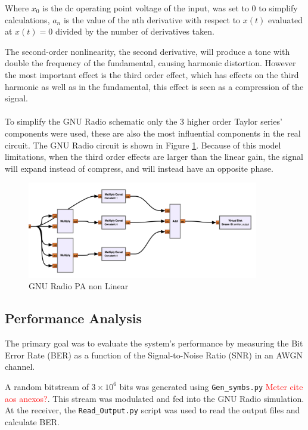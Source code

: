 Where \(x_0\) is the dc operating point voltage of the input, was set to 0 to simplify calculations, \(a_n\) is the value of the nth derivative with respect to \(x(t)\) evaluated at \(x(t) = 0\) divided by the number of derivatives taken.

The second-order nonlinearity, the second derivative, will produce a tone with double the frequency of the fundamental, causing harmonic distortion. However the most important effect is the third order effect, which has effects on the third harmonic as well as in the fundamental, this effect is seen as a compression of the signal.   

\paragraph{}
To simplify the GNU Radio schematic only the 3 higher order Taylor series' components were 
used, these are also the most influential components in the real circuit. The GNU Radio 
circuit is shown in Figure \ref{fig:PA_non_lin}. Because of this model limitations, when the third order effects are larger than the linear gain, the signal will expand instead of compress, and will instead have an opposite phase.

\begin{figure}[H]
    \centering
    \includegraphics*[width=0.9\textwidth]{Images/PA_non_lin.png}
    \caption{GNU Radio PA non Linear}
    \label{fig:PA_non_lin}
\end{figure}

\subsection{Performance Analysis}

The primary goal was to evaluate the system's performance by measuring the Bit Error Rate (BER) as a function of the Signal-to-Noise Ratio (SNR) in an AWGN channel.

A random bitstream of $3 \times 10^6$ bits was generated using \texttt{Gen\_symbs.py} \textcolor{red}{Meter cite aos anexos?}. This stream was modulated and fed into the GNU Radio simulation. At the receiver, the \texttt{Read\_Output.py} script was used to read the output files and calculate BER.

